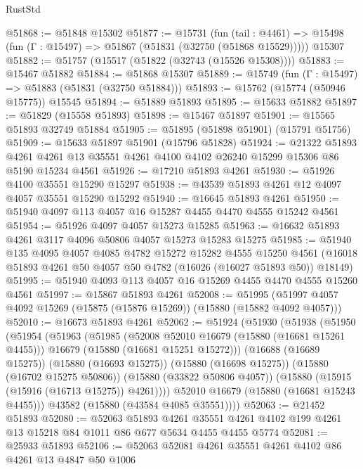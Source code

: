 \begin{lexlean}{RustStd}
\begin{coremodule}
@51868 := @51848 @15302
@51877 := @15731
    (fun (tail : @4461) => @15498 (fun (Γ : @15497) => @51867 (@51831 (@32750 (@51868 @15529)))))
    @15307
@51882 := @51757 (@15517 (@51822 (@32743 (@15526 @15308))))
@51883 := @15467 @51882
@51884 := @51868 @15307
@51889 := @15749 (fun (Γ : @15497) => @51883 (@51831 (@32750 @51884)))
@51893 := @15762 (@15774 (@50946 @15775)) @15545
@51894 := @51889 @51893
@51895 := @15633 @51882
@51897 := @51829 (@15558 @51893)
@51898 := @15467 @51897
@51901 := @15565 @51893 @32749 @51884
@51905 := @51895 (@51898 @51901) (@15791 @51756)
@51909 := @15633 @51897 @51901 (@15796 @51828)
@51924 := @21322
    @51893
    @4261
    @4261
    @13
    @35551
    @4261
    @4100
    @4102
    @26240
    @15299
    @15306
    @86
    @5190
    @15234
    @4561
@51926 := @17210 @51893 @4261
@51930 := @51926 @4100 @35551 @15290 @15297
@51938 := @43539 @51893 @4261 @12 @4097 @4057 @35551 @15290 @15292
@51940 := @16645 @51893 @4261
@51950 := @51940 @4097 @113 @4057 @16 @15287 @4455 @4470 @4555 @15242 @4561
@51954 := @51926 @4097 @4057 @15273 @15285
@51963 := @16632 @51893 @4261 @3117 @4096 @50806 @4057 @15273 @15283 @15275
@51985 := @51940
    @135
    @4095
    @4057
    @4085
    @4782
    @15272
    @15282
    @4555
    @15250
    @4561
    (@16018 @51893 @4261 @50 @4057 @50 @4782 (@16026 (@16027 @51893 @50)) @18149)
@51995 := @51940 @4093 @113 @4057 @16 @15269 @4455 @4470 @4555 @15260 @4561
@51997 := @15867 @51893 @4261
@52008 := @51995 (@51997 @4057 @4092 @15269 (@15875 (@15876 @15269)) (@15880 (@15882 @4092 @4057)))
@52010 := @16673 @51893 @4261
@52062 := @51924
    (@51930
      (@51938
        (@51950
          (@51954
            (@51963
              (@51985
                (@52008 @52010 @16679 (@15880 (@16681 @15261 @4455)))
                @16679
                (@15880 (@16681 @15251 @15272)))
              (@16688 (@16689 @15275))
              (@15880 (@16693 @15275))
              (@15880 (@16698 @15275))
              (@15880 (@16702 @15275 @50806))
              (@15880 (@33822 @50806 @4057))
              (@15880 (@15915 (@15916 (@16713 @15275)) @4261))))
          @52010
          @16679
          (@15880 (@16681 @15243 @4455)))
        @43582
        (@15880 (@43584 @4085 @35551))))
@52063 := @21452 @51893
@52080 := @52063
    @51893
    @4261
    @35551
    @4261
    @4102
    @199
    @4261
    @13
    @15218
    @84
    @1011
    @86
    @677
    @5634
    @4455
    @4455
    @5774
@52081 := @25933 @51893
@52106 := @52063
    @52081
    @4261
    @35551
    @4261
    @4102
    @86
    @4261
    @13
    @4847
    @50
    @1006

\end{coremodule}
\end{lexlean}
